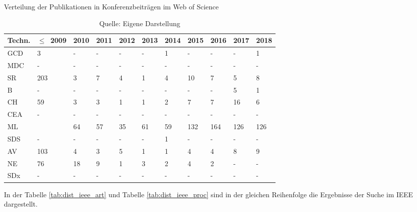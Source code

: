 \begin{table}
	\caption{Verteilung der Publikationen in Konferenzbeiträgen im \glqq Web of Science\grqq}
	\selectfont
	\footnotesize
	\centering
	\label{tab:dist_wos_proc}
\begin{tabularx}{\linewidth}{XXXXXXXXXXX}
	\hline
	Techn. & $\leq$~2009 & 2010 & 2011 & 2012 & 2013 & 2014 & 2015 & 2016 & 2017 & 2018 \\
	\hline
	GCD & 3 & - & - & - & - & 1 & - & - & - & 1 \\
	MDC & - & - & - & - & - & - & - & - & - & - \\
	SR & 203 & 3 & 7 & 4 & 1 & 4 & 10 & 7 & 5 & 8 \\
	B & - & - & - & - & - & - & - & - & 5 & 1 \\
	CH & 59 & 3 & 3 & 1 & 1 & 2 & 7 & 7 & 16 & 6 \\
	CEA & - & - & - & - & - & - & - & - & - & - \\
	ML & \numprint{2042} & 64 & 57 & 35 & 61 & 59 & 132 & 164 & 126 & 126 \\
	SDS & - & - & - & - & - & 1 & - & - & - & - \\
	AV & 103 & 4 & 3 & 5 & 1 & 1 & 4 & 4 & 8 & 9 \\
	NE & 76 & 18 & 9 & 1 & 3 & 2 & 4 & 2 & - & - \\
	SDx & - & - & - & - & - & - & - & - & - & - \\
	\hline
\end{tabularx}
\caption*{Quelle: Eigene Darstellung}
\end{table}

In der Tabelle \ref{tab:dist_ieee_art} und Tabelle \ref{tab:dist_ieee_proc} sind in der gleichen Reihenfolge die Ergebnisse der Suche im IEEE dargestellt.

